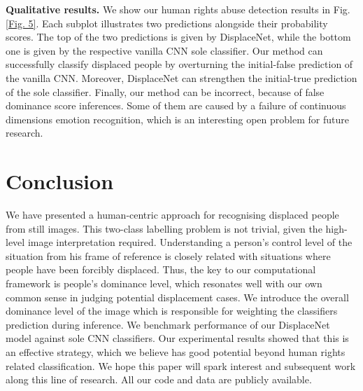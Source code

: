 \documentclass[10pt,twocolumn,letterpaper]{article}
\begin{document}
\noindent
\textbf{Qualitative results.} We show our human rights abuse detection results in Fig. \ref{Fig. 5}. Each subplot illustrates two predictions alongside their probability scores. The top of the two predictions is given by DisplaceNet, while the bottom one is given by the respective vanilla CNN sole classifier. Our method can successfully classify displaced people by overturning the initial-false prediction of the vanilla CNN. Moreover, DisplaceNet can strengthen the initial-true prediction of the sole classifier. Finally, our method can be incorrect, because of false dominance score inferences. Some of them are caused by a failure of continuous dimensions emotion recognition, which is an interesting open problem for future research.






\section{Conclusion}

We have presented a human-centric approach for recognising displaced people from still images. This two-class labelling problem is not trivial, given the high-level image interpretation required. Understanding a person's control level of the situation from his frame of reference is closely related with situations where people have been forcibly displaced. Thus, the key to our computational framework is people's dominance level, which resonates well with our own common sense in judging potential displacement cases. We introduce the overall dominance level of the image which is responsible for weighting the classifiers prediction during inference. We benchmark performance of our DisplaceNet model against sole CNN classifiers. Our experimental results showed that this is an effective strategy, which we believe has good potential beyond human rights related classification. We hope this paper will spark interest and subsequent work along this line of research. All our code and data are publicly available.


























{\small


}
\end{document}

